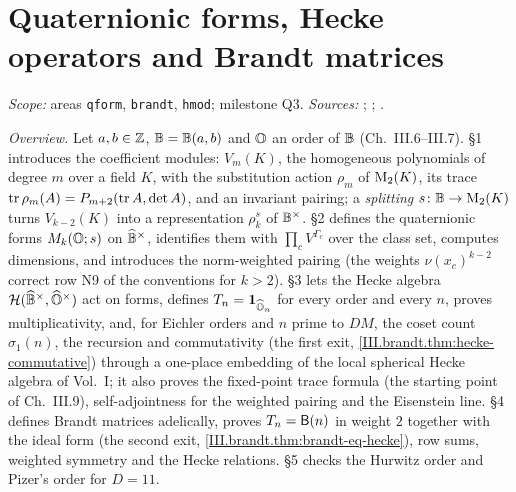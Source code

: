 
\chapter{Quaternionic forms, Hecke operators and Brandt matrices}\label{ch:ch-iii-08-brandt}

\noindent\emph{Scope:} areas \texttt{qform}, \texttt{brandt}, \texttt{hmod}; milestone Q3. \emph{Sources:} \cite[§§1--2, pp.~169--173]{Shz};
\cite[Def.~2.13, p.~353; Lemma~2.18, p.~356; Prop.~2.22, p.~358]{Piz}; \cite[Ch.~41]{Voi}.

\noindent\emph{Overview.} Let $a,b\in\mathbb{Z}$, $\mathbb{B}=\mathbb{B}(a,b)$ and $\mathbb{O}$ an order of $\mathbb{B}$ (Ch.~III.6--III.7). §1 introduces the coefficient
modules: $V_m(K)$, the homogeneous polynomials of degree $m$ over a field $K$, with the substitution action $\rho_m$ of $\mathrm{M}_2(K)$, its trace
$\operatorname{tr}\rho_m(A)=P_{m+2}(\operatorname{tr} A,\det A)$, and an invariant pairing; a \emph{splitting} $s\colon\mathbb{B}\to\mathrm{M}_2(K)$ turns $V_{k-2}(K)$ into a
representation $\rho_k^s$ of $\mathbb{B}^\times$. §2 defines the quaternionic forms $M_k(\mathbb{O};s)$ on $\widehat{\mathbb{B}}^\times$, identifies them with
$\prod_cV^{\Gamma_c}$ over the class set, computes dimensions, and introduces the norm-weighted pairing (the weights $\nu(x_c)^{k-2}$ correct row
N9 of the conventions for $k>2$). §3 lets the Hecke algebra $\mathcal H(\widehat{\mathbb{B}}^\times,\widehat{\mathbb{O}}^\times)$ act on forms, defines
$T_n=\mathbf 1_{\widehat{\mathbb{O}}_n}$ for every order and every $n$, proves multiplicativity, and, for Eichler orders and $n$ prime to $DM$, the coset
count $\sigma_1(n)$, the recursion and commutativity (the first exit, \cref{III.brandt.thm:hecke-commutative}) through a one-place embedding of
the local spherical Hecke algebra of Vol.~I; it also proves the fixed-point trace formula (the starting point of Ch.~III.9), self-adjointness
for the weighted pairing and the Eisenstein line. §4 defines Brandt matrices adelically, proves $T_n=\mathsf{B}(n)$ in weight $2$ together with the
ideal form (the second exit, \cref{III.brandt.thm:brandt-eq-hecke}), row sums, weighted symmetry and the Hecke relations. §5 checks the
Hurwitz order and Pizer's order for $D=11$.


